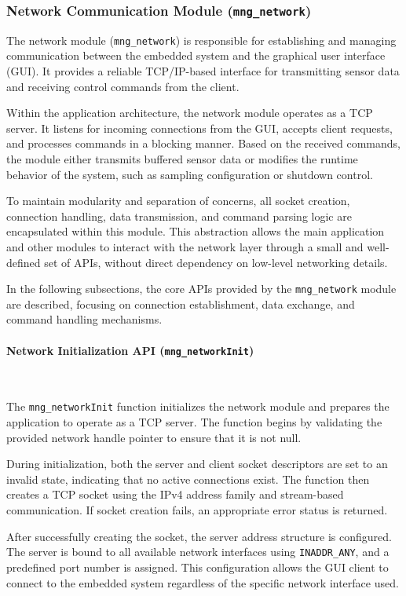 \documentclass{article}
\begin{document}
\subsubsection{Network Communication Module (\texttt{mng\_network})}

The network module (\texttt{mng\_network}) is responsible for establishing and managing 
communication between the embedded system and the graphical user interface (GUI). 
It provides a reliable TCP/IP-based interface for transmitting sensor data and 
receiving control commands from the client.

Within the application architecture, the network module operates as a TCP server. It 
listens for incoming connections from the GUI, accepts client requests, and processes 
commands in a blocking manner. Based on the received commands, the module either 
transmits buffered sensor data or modifies the runtime behavior of the system, such as 
sampling configuration or shutdown control.

To maintain modularity and separation of concerns, all socket creation, connection 
handling, data transmission, and command parsing logic are encapsulated within this 
module. This abstraction allows the main application and other modules to interact with 
the network layer through a small and well-defined set of APIs, without direct 
dependency on low-level networking details.

In the following subsections, the core APIs provided by the \texttt{mng\_network} module 
are described, focusing on connection establishment, data exchange, and command 
handling mechanisms.


\paragraph{Network Initialization API (\texttt{mng\_networkInit})}\

The \texttt{mng\_networkInit} function initializes the network module and prepares the 
application to operate as a TCP server. The function begins by validating the provided 
network handle pointer to ensure that it is not null.

During initialization, both the server and client socket descriptors are set to an 
invalid state, indicating that no active connections exist. The function then creates 
a TCP socket using the IPv4 address family and stream-based communication. If socket 
creation fails, an appropriate error status is returned.

After successfully creating the socket, the server address structure is configured. 
The server is bound to all available network interfaces using \texttt{INADDR\_ANY}, and 
a predefined port number is assigned. This configuration allows the GUI client to connect 
to the embedded system regardless of the specific network interface used.
\end{document}
